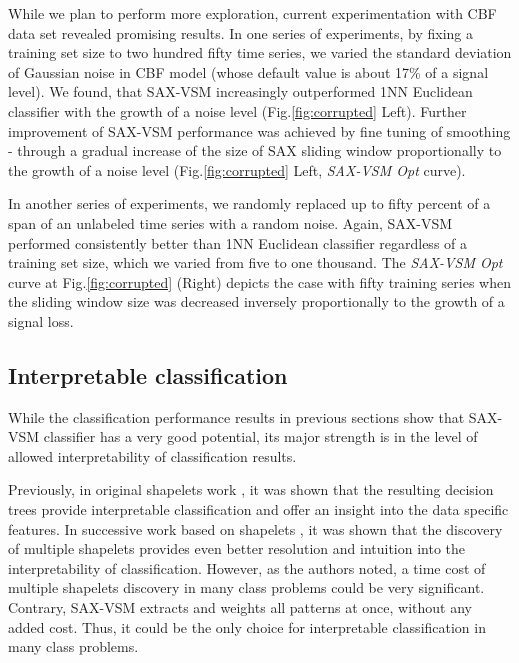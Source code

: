 While we plan to perform more exploration, current experimentation with CBF data set revealed 
promising results. 
In one series of experiments, by fixing a training set size to two hundred fifty time series, we
varied the standard deviation of Gaussian noise in CBF model (whose default value is about 
17\% of a signal level). We found, that SAX-VSM increasingly outperformed 1NN Euclidean classifier 
with the growth of a noise level (Fig.\ref{fig:corrupted} Left). 
Further improvement of SAX-VSM performance was achieved by fine tuning of smoothing - 
through a gradual increase of the size of SAX sliding window proportionally to the growth of 
a noise level (Fig.\ref{fig:corrupted} Left, \textit{SAX-VSM Opt} curve). 

In another series of experiments, we randomly replaced up to fifty percent of a span of an 
unlabeled time series with a random noise. 
Again, SAX-VSM performed consistently better than 1NN Euclidean classifier regardless of a 
training set size, which we varied from five to one thousand. 
The \textit{SAX-VSM Opt} curve at Fig.\ref{fig:corrupted} (Right) depicts the case
with fifty training series when the sliding window size was decreased inversely proportionally 
to the growth of a signal loss.

\subsection{Interpretable classification}
While the classification performance results in previous sections show that SAX-VSM 
classifier has a very good potential, its major strength is in the level of allowed 
interpretability of classification results. 

Previously, in original shapelets work \cite{citeulike:7344347, citeulike:11957982}, it was shown that the 
resulting decision trees provide interpretable classification and offer an insight into the data
specific features. In successive work based on shapelets \cite{citeulike:11345338}, it was shown that
the discovery of multiple shapelets provides even better resolution and intuition into 
the interpretability of classification. 
However, as the authors noted, a time cost of multiple shapelets discovery
in many class problems could be very significant. 
Contrary, SAX-VSM extracts and weights all patterns at once, without any added cost. Thus, it could
be the only choice for interpretable classification in many class problems.

